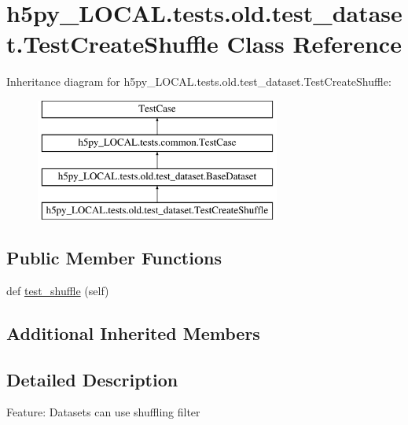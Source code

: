 \hypertarget{classh5py__LOCAL_1_1tests_1_1old_1_1test__dataset_1_1TestCreateShuffle}{}\section{h5py\+\_\+\+L\+O\+C\+A\+L.\+tests.\+old.\+test\+\_\+dataset.\+Test\+Create\+Shuffle Class Reference}
\label{classh5py__LOCAL_1_1tests_1_1old_1_1test__dataset_1_1TestCreateShuffle}
Inheritance diagram for h5py\+\_\+\+L\+O\+C\+A\+L.\+tests.\+old.\+test\+\_\+dataset.\+Test\+Create\+Shuffle\+:\begin{figure}[H]
\begin{center}
\leavevmode
\includegraphics[height=4.000000cm]{classh5py__LOCAL_1_1tests_1_1old_1_1test__dataset_1_1TestCreateShuffle}
\end{center}
\end{figure}
\subsection*{Public Member Functions}
\begin{DoxyCompactItemize}
\item 
def \hyperlink{classh5py__LOCAL_1_1tests_1_1old_1_1test__dataset_1_1TestCreateShuffle_a93acbaad36db232e04bce87c83920095}{test\+\_\+shuffle} (self)
\end{DoxyCompactItemize}
\subsection*{Additional Inherited Members}


\subsection{Detailed Description}
\begin{DoxyVerb}    Feature: Datasets can use shuffling filter
\end{DoxyVerb}
 

